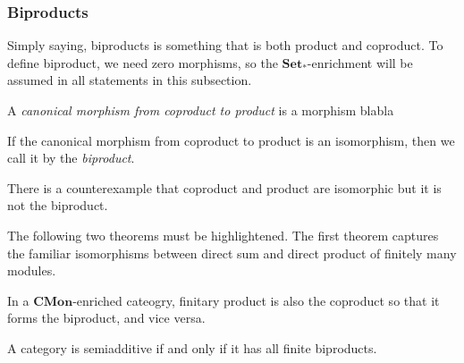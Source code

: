\documentclass[12pt]{article}
\begin{document}
\subsubsection{Biproducts}
Simply saying, biproducts is something that is both product and coproduct.
To define biproduct, we need zero morphisms, so the $\mathbf{Set_*}$-enrichment will be assumed in all statements in this subsection.
\begin{defn}
A \emph{canonical morphism from coproduct to product} is a morphism blabla
\end{defn}
\begin{defn}[Biproduct]
If the canonical morphism from coproduct to product is an isomorphism, then we call it by the \emph{biproduct}.
\end{defn}
There is a counterexample that coproduct and product are isomorphic but it is not the biproduct.




The following two theorems must be highlightened.
The first theorem captures the familiar isomorphisms between direct sum and direct product of finitely many modules.
\begin{thm}
In a $\mathbf{CMon}$-enriched cateogry, finitary product is also the coproduct so that it forms the biproduct, and vice versa.
\end{thm}

\begin{thm}
A category is semiadditive if and only if it has all finite biproducts.
\end{thm}
\end{document}
